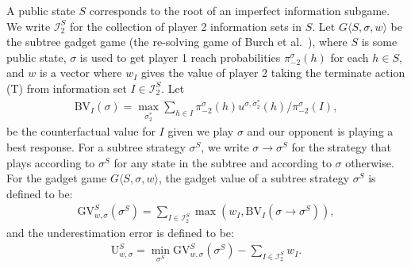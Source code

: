 A public state $S$ corresponds to the root of an imperfect information subgame.
We write $\mathcal{I}_2^S$ for the collection of player 2 information sets in $S$. 
Let $G\langle S, \sigma, w\rangle$ be the subtree gadget game (the re-solving game of Burch et al.~\cite{cprg:cfrd}), where $S$ is some public state, $\sigma$ is used to get player 1 reach probabilities $\pi^{\sigma}_{-2}(h)$ for each $h \in S$, and $w$ is a vector where $w_I$ gives the value of player 2 taking the terminate action (T) from information set $I \in \mathcal{I}_2^S$.
Let 
\begin{align*}
\text{BV}_I(\sigma) = \max_{\sigma^*_2}\sum_{h \in I} \pi^{\sigma}_{-2}(h) u^{\sigma,\sigma_2^*}(h) / \pi^{\sigma}_{-2}(I),
\end{align*}
be the counterfactual value for $I$ given we play $\sigma$ and our opponent is playing a best response.
For a subtree strategy $\sigma^S$, we write $\sigma \to \sigma^S$ for the strategy that plays according to $\sigma^S$ for any state in the subtree and according to $\sigma$ otherwise.  For the gadget game $G\langle S, \sigma, w\rangle$, the gadget value of a subtree strategy $\sigma^S$ is defined to be:
\begin{align*}
  \text{GV}^S_{w,\sigma}(\sigma^S) = \sum_{I \in \mathcal{I}^S_2} \max(w_I,\text{BV}_I(\sigma\to\sigma^S)),
\end{align*}
and the underestimation error is defined to be:
\begin{align*}
  \text{U}^S_{w,\sigma} = \min_{\sigma^S} \text{GV}^S_{w,\sigma}(\sigma^S) - \sum_{I \in \mathcal{I}^S_2}w_I.
\end{align*}

